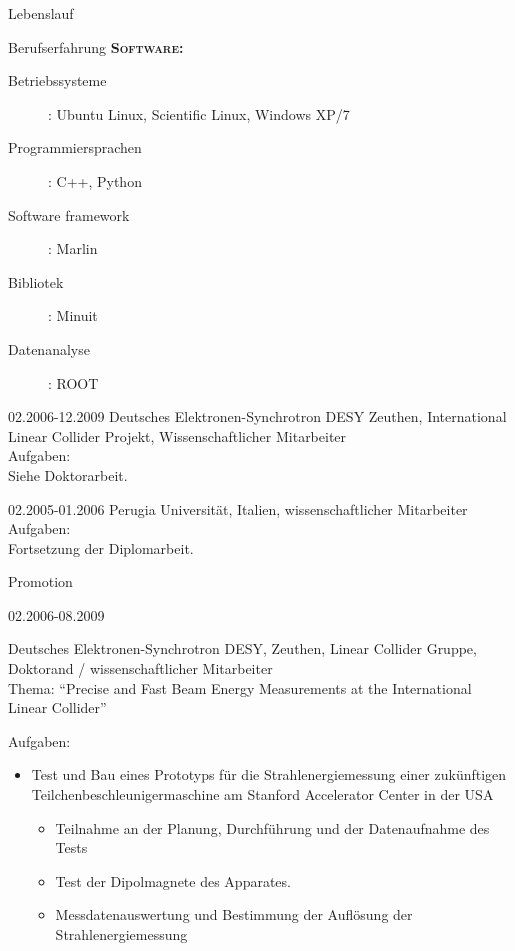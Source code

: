 \documentclass[11pt,a4paper]{scrartcl}
\begin{document}
\begin{cv}{Lebenslauf}
\begin{cvlist}{Berufserfahrung}
    {\scshape {\bfseries Software:}}
    \begin{description} 
    \item[Betriebssysteme] : Ubuntu Linux, Scientific Linux, Windows
      XP/7
    \item[Programmiersprachen] : C++, Python
    \item[Software framework] : Marlin
    \item[Bibliotek] : Minuit
    \item[Datenanalyse] : ROOT
    \end{description}
    
  \item[02.2006-12.2009] Deutsches Elektronen-Synchrotron DESY Zeuthen,
    International Linear Collider Projekt, Wissenschaftlicher Mitarbeiter \\
    
    Aufgaben:\\
    
    Siehe Doktorarbeit.
    
  \item[02.2005-01.2006] Perugia
    Universit\"at, Italien, wissenschaftlicher Mitarbeiter \\
    
    Aufgaben:\\
    
    Fortsetzung der Diplomarbeit.
    
  \end{cvlist}
  
  \begin{cvlist}{Promotion}
  \item[02.2006-08.2009] 
    
    Deutsches Elektronen-Synchrotron DESY, Zeuthen, Linear Collider
    Gruppe, Doktorand / wissenschaftlicher Mitarbeiter\\ Thema:
    "`Precise and Fast Beam Energy Measurements at the International
    Linear Collider"'

    Aufgaben:\\ 
    
    \begin{itemize}
      
    \item Test und Bau eines Prototyps f{\"u}r die
      Strahlenergiemessung einer zuk{\"u}nftigen
      Teilchenbeschleunigermaschine am Stanford Accelerator Center in
      der USA
      \begin{itemize}
      \item Teilnahme an der Planung, Durchf{\"u}hrung und der
        Datenaufnahme des Tests
      \item Test der Dipolmagnete des Apparates.
      \item Messdatenauswertung und Bestimmung der Aufl{\"o}sung der
        Strahlenergiemessung
      \end{itemize}
      

\end{itemize}
\end{cvlist}
\end{cv}
\end{document}
